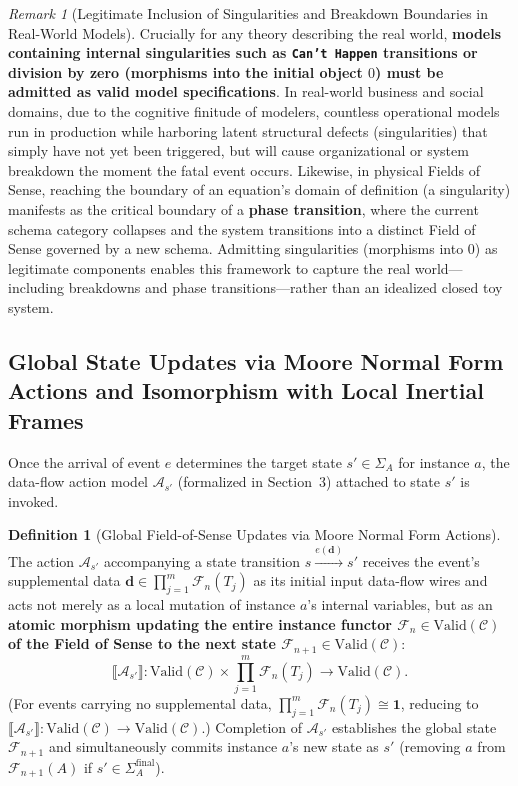 \documentclass[11pt,a4paper]{article}
\theoremstyle{definition}
\newtheorem{definition}{Definition}[section]
\theoremstyle{plain}
\theoremstyle{remark}
\newtheorem{remark}{Remark}[section]
\newcommand{\Valid}{\mathrm{Valid}}
\begin{document}
\begin{remark}[Legitimate Inclusion of Singularities and Breakdown Boundaries in Real-World Models]\label{rem:singularities}
Crucially for any theory describing the real world, \textbf{models containing internal singularities such as \texttt{Can't Happen} transitions or division by zero (morphisms into the initial object $0$) must be admitted as valid model specifications}. In real-world business and social domains, due to the cognitive finitude of modelers, countless operational models run in production while harboring latent structural defects (singularities) that simply have not yet been triggered, but will cause organizational or system breakdown the moment the fatal event occurs. Likewise, in physical Fields of Sense, reaching the boundary of an equation's domain of definition (a singularity) manifests as the critical boundary of a \textbf{phase transition}, where the current schema category collapses and the system transitions into a distinct Field of Sense governed by a new schema. Admitting singularities (morphisms into $0$) as legitimate components enables this framework to capture the real world---including breakdowns and phase transitions---rather than an idealized closed toy system.
\end{remark}

\subsection{Global State Updates via Moore Normal Form Actions and Isomorphism with Local Inertial Frames}
Once the arrival of event $e$ determines the target state $s' \in \Sigma_A$ for instance $a$, the data-flow action model $\mathcal{A}_{s'}$ (formalized in Section~3) attached to state $s'$ is invoked.

\begin{definition}[Global Field-of-Sense Updates via Moore Normal Form Actions]\label{def:moore-action}
The action $\mathcal{A}_{s'}$ accompanying a state transition $s \xrightarrow{e(\mathbf{d})} s'$ receives the event's supplemental data $\mathbf{d} \in \prod_{j=1}^m \mathcal{F}_n(T_j)$ as its initial input data-flow wires and acts not merely as a local mutation of instance $a$'s internal variables, but as an \textbf{atomic morphism updating the entire instance functor $\mathcal{F}_n \in \Valid(\mathcal{C})$ of the Field of Sense to the next state $\mathcal{F}_{n+1} \in \Valid(\mathcal{C})$}:
\begin{equation}
\llbracket \mathcal{A}_{s'} \rrbracket : \Valid(\mathcal{C}) \times \prod_{j=1}^m \mathcal{F}_n(T_j) \longrightarrow \Valid(\mathcal{C}).
\end{equation}
(For events carrying no supplemental data, $\prod_{j=1}^m \mathcal{F}_n(T_j) \cong \mathbf{1}$, reducing to $\llbracket \mathcal{A}_{s'} \rrbracket : \Valid(\mathcal{C}) \to \Valid(\mathcal{C})$.) Completion of $\mathcal{A}_{s'}$ establishes the global state $\mathcal{F}_{n+1}$ and simultaneously commits instance $a$'s new state as $s'$ (removing $a$ from $\mathcal{F}_{n+1}(A)$ if $s' \in \Sigma_A^{\mathrm{final}}$).
\end{definition}
\end{document}
